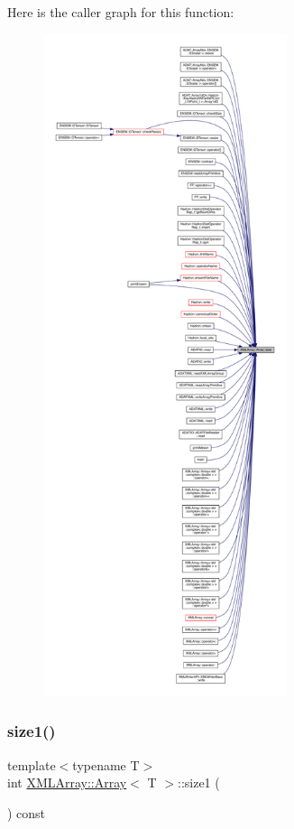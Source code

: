 Here is the caller graph for this function\+:\nopagebreak
\begin{figure}[H]
\begin{center}
\leavevmode
\includegraphics[height=550pt]{db/d6c/classXMLArray_1_1Array_ab59904c2aa0e31c18c6cd5f5a186e292_icgraph}
\end{center}
\end{figure}
\mbox{\label{classXMLArray_1_1Array_a33e863988af56d045439d31058088c8c}} 
\subsubsection{\texorpdfstring{size1()}{size1()}\hspace{0.1cm}{\footnotesize\ttfamily [1/2]}}
{\footnotesize\ttfamily template$<$typename T$>$ \\
int \mbox{\hyperlink{classXMLArray_1_1Array}{X\+M\+L\+Array\+::\+Array}}$<$ T $>$\+::size1 (\begin{DoxyParamCaption}{ }\end{DoxyParamCaption}) const\hspace{0.3cm}{\ttfamily [inline]}}

